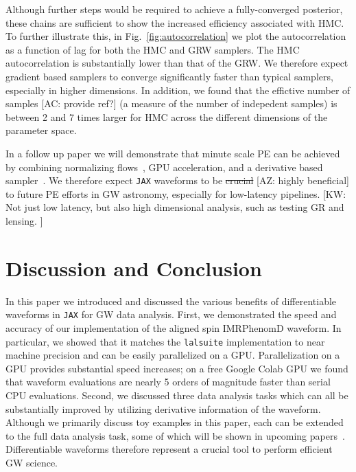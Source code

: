 \documentclass[twocolumn]{aastex631}
\newcommand{\jax}{\texttt{JAX}\xspace}
\newcommand{\lalsuite}{\texttt{lalsuite}\xspace}
\newcommand{\kw}[1]{{\color{rb4}[KW: #1 ]}}
\newcommand{\AZ}[1]{{\color{Burnt}[AZ: #1]}}
\newcommand{\amc}[1]{{\color{red}[AC: #1]}}
\begin{document}
Although further steps would be required to achieve a fully-converged posterior, these chains are sufficient to show the increased efficiency associated with HMC. 
To further illustrate this, in Fig.~\ref{fig:autocorrelation} we plot the autocorrelation as a function of lag for both the HMC and GRW samplers.
The HMC autocorrelation is substantially lower than that of the GRW.
We therefore expect gradient based samplers to converge significantly faster than typical samplers, especially in higher dimensions.
In addition, we found that the effictive number of samples 
\amc{provide ref?} 
(a measure of the number of indepedent samples) is between 2 and 7 times larger for HMC across the different dimensions of the parameter space.

In a follow up paper we will demonstrate that minute scale PE can be achieved by combining normalizing flows~\citep{2022arXiv221106397W, Gabrie:2021tlu}, GPU acceleration, and a derivative based sampler~\citep{PEpaper}. 
We therefore expect \jax waveforms to be \sout{crucial} \AZ{highly beneficial} to future PE efforts in GW astronomy, especially for low-latency pipelines.
\kw{Not just low latency, but also high dimensional analysis, such as testing GR and lensing.}

\section{Discussion and Conclusion}
\label{subsec:discussion}

In this paper we introduced and discussed the various benefits of differentiable waveforms in \jax for GW data analysis.
First, we demonstrated the speed and accuracy of our implementation of the aligned spin IMRPhenomD waveform.
In particular, we showed that it matches the \lalsuite implementation to near machine precision and can be easily parallelized on a GPU.
Parallelization on a GPU provides substantial speed increases; on a free Google Colab GPU we found that waveform evaluations are nearly 5 orders of magnitude faster than serial CPU evaluations.
Second, we discussed three data analysis tasks which can all be substantially improved by utilizing derivative information of the waveform.
Although we primarily discuss toy examples in this paper, each can be extended to the full data analysis task, some of which will be shown in upcoming papers~\citep{PEpaper}.
Differentiable waveforms therefore represent a crucial tool to perform efficient GW science.
\end{document}
